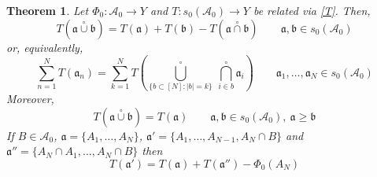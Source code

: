 \documentclass[11pt]{amsart}
\newtheorem{theorem}{Theorem}
\theoremstyle{plain}
\begin{document}
\begin{theorem} 
\label{th pre norberg} 
Let $\Phi_0:{\mathscr{A}}_0\to Y$ and $T:s_0({\mathscr{A}}_0)\to Y$ be related via \eqref{T}.
Then,
\begin{equation}
\label{decomposition}
T({\mathfrak a}{\overset\circ\cup}{\mathfrak b})
=
T({\mathfrak a})+T({\mathfrak b})-T({\mathfrak a}{\overset\circ\cap}{\mathfrak b})
\qquad{\mathfrak a},{\mathfrak b}\in s_0({\mathscr{A}}_0)
\end{equation}
or, equivalently,
\begin{equation}
\label{modular T}
\sum_{n=1}^NT({\mathfrak a}_n)
=
\sum_{k=1}^NT
\left(\underset{\{b\subset[N]:{\vert b\vert}=k\}}{\overset\circ\bigcup}\ \underset{i\in b}{\overset\circ\bigcap}{\mathfrak a}_i\right)
\qquad
{\mathfrak a}_1,\ldots,{\mathfrak a}_N\in s_0({\mathscr{A}}_0)
\end{equation}
Moreover,
\begin{equation}
\label{parsimony}
T({\mathfrak a}{\overset\circ\cup}{\mathfrak b})=T({\mathfrak a})
\qquad{\mathfrak a},{\mathfrak b}\in s_0({\mathscr{A}}_0),\ {\mathfrak a}\ge{\mathfrak b}
\end{equation}
If $B\in{\mathscr{A}}_0$, ${\mathfrak a}=\{A_1,\ldots,A_N\}$, ${\mathfrak a}'=\{A_1,\ldots,A_{N-1},A_N\cap B\}$
and ${\mathfrak a}''=\{A_N\cap A_1,\ldots,A_N\cap B\}$ then
\begin{equation}
\label{associative}
T({\mathfrak a}')
=
T({\mathfrak a})+T({\mathfrak a}'')-\Phi_0(A_N)
\end{equation}
\end{theorem}
\end{document}
